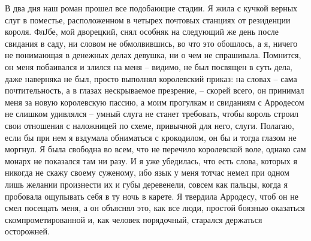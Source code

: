 В два  дня наш роман  прошел все подобающие стадии.  Я жила с  кучкой верных
слуг в  поместье, расположенном  в четырех  почтовых станциях  от резиденции
короля.  ФлЈбе, мой  дворецкий,  снял  особняк на  следующий  же день  после
свидания в саду, ни словом не обмолвившись, во что это обошлось, а я, ничего
не понимающая в денежных делах девушка, ни о чем не спрашивала. Помнится, он
меня побаивался  и злился на  меня -- видимо, не  был посвящен в  суть дела,
даже наверняка не был, просто выполнял королевский приказ: на словах -- сама
почтительность,  а в  глазах  нескрываемое презрение,  --  скорей всего,  он
принимал меня  за новую королевскую пассию,  а моим прогулкам и  свиданиям с
Арродесом не  слишком удивлялся  -- умный слуга  не станет  требовать, чтобы
король  строил свои  отношения с  наложницей по  схеме, привычной  для него,
слуги. Полагаю, если бы при нем я  вздумала обниматься с крокодилом, он бы и
тогда  глазом  не  моргнул.  Я  была  свободна  во  всем,  что  не  перечило
королевской  воле, однако  сам монарх  не  показался там  ни разу.  И я  уже
убедилась, что есть  слова, которых я никогда не скажу  своему суженому, ибо
язык  у меня  тотчас  немел при  одном  лишь желании  произнести  их и  губы
деревенели, совсем как пальцы, когда я  пробовала ощупывать себя в ту ночь в
карете. Я  твердила Арродесу, чтоб он  не смел посещать меня,  а он объяснял
это,  как все  люди, простой  боязнью оказаться  скомпрометированной и,  как
человек порядочный, старался держаться осторожней.


